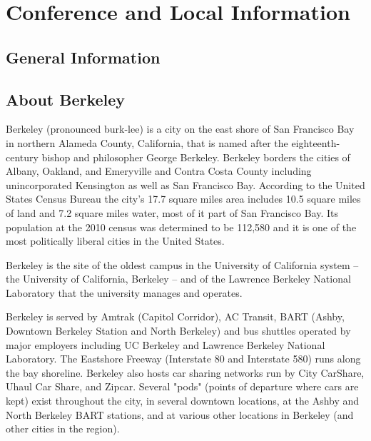 \chapter{Conference and Local Information}

\setlength\fboxsep{0pt}
\setlength\fboxrule{0.5pt}



\vspace{-1.0cm}
 \section{General Information}

\section*{About Berkeley}

Berkeley (pronounced burk-lee) is a city on the east shore of San Francisco Bay in northern Alameda County, California, that is named after the eighteenth-century bishop and philosopher George Berkeley. Berkeley borders the cities of Albany, Oakland, and Emeryville and Contra Costa County including unincorporated Kensington as well as San Francisco Bay. According to the United States Census Bureau the city's 17.7 square miles area includes 10.5 square miles of land and 7.2 square miles water, most of it part of San Francisco Bay. Its population at the 2010 census was determined to be 112,580 and it is one of the most politically liberal cities in the United States.

Berkeley is the site of the oldest campus in the University of California system – the University of California, Berkeley – and of the Lawrence Berkeley National Laboratory that the university manages and operates. 

Berkeley is served by Amtrak (Capitol Corridor), AC Transit, BART (Ashby, Downtown Berkeley Station and North Berkeley) and bus shuttles operated by major employers including UC Berkeley and Lawrence Berkeley National Laboratory. The Eastshore Freeway (Interstate 80 and Interstate 580) runs along the bay shoreline. Berkeley also hosts car sharing networks run by City CarShare, Uhaul Car Share, and Zipcar. Several "pods" (points of departure where cars are kept) exist throughout the city, in several downtown locations, at the Ashby and North Berkeley BART stations, and at various other locations in Berkeley (and other cities in the region).

